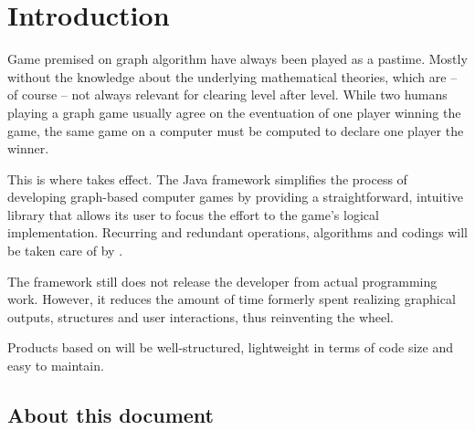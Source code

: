 \section{Introduction}
Game premised on graph algorithm have always been played as a pastime. Mostly without the knowledge about the underlying mathematical theories, which are -- of course -- not always relevant for clearing level after level. While two humans playing a graph game usually agree on the eventuation of one player winning the game, the same game on a computer must be computed to declare one player the winner.\par

This is where \graphioli takes effect. The Java framework simplifies the process of developing graph-based computer games by providing a straightforward, intuitive library that allows its user to focus the effort to the game's logical implementation. Recurring and redundant operations, algorithms and codings will be taken care of by \graphioli.\par

The framework still does not release the developer from actual programming work. However, it reduces the amount of time formerly spent realizing graphical outputs, structures and user interactions, thus reinventing the wheel.\par

Products based on \graphioli will be well-structured, lightweight in terms of code size and easy to maintain.\par

\subsection{About this document}

